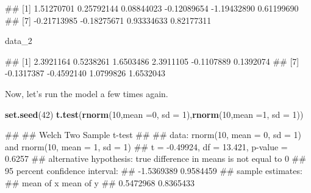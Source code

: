 \documentclass[
]{book}
\newenvironment{Shaded}{\begin{snugshade}}{\end{snugshade}}
\newcommand{\AttributeTok}[1]{\textcolor[rgb]{0.13,0.29,0.53}{#1}}
\newcommand{\DecValTok}[1]{\textcolor[rgb]{0.00,0.00,0.81}{#1}}
\newcommand{\FunctionTok}[1]{\textcolor[rgb]{0.13,0.29,0.53}{\textbf{#1}}}
\newcommand{\NormalTok}[1]{#1}
\begin{document}
\begin{Shaded}
\begin{Highlighting}[]
\NormalTok{\#\#  [1]  1.51270701  0.25792144  0.08844023 {-}0.12089654 {-}1.19432890  0.61199690}
\NormalTok{\#\#  [7] {-}0.21713985 {-}0.18275671  0.93334633  0.82177311}
\end{Highlighting}
\end{Shaded}

\begin{Shaded}
\begin{Highlighting}[]
\NormalTok{data\_2}
\end{Highlighting}
\end{Shaded}

\begin{Shaded}
\begin{Highlighting}[]
\NormalTok{\#\#  [1]  2.3921164  0.5238261  1.6503486  2.3911105 {-}0.1107889  0.1392074}
\NormalTok{\#\#  [7] {-}0.1317387 {-}0.4592140  1.0799826  1.6532043}
\end{Highlighting}
\end{Shaded}

Now, let's run the model a few times again.

\begin{Shaded}
\begin{Highlighting}[]
\FunctionTok{set.seed}\NormalTok{(}\DecValTok{42}\NormalTok{)}
\FunctionTok{t.test}\NormalTok{(}\FunctionTok{rnorm}\NormalTok{(}\DecValTok{10}\NormalTok{,}\AttributeTok{mean =}\DecValTok{0}\NormalTok{, }\AttributeTok{sd =} \DecValTok{1}\NormalTok{),}\FunctionTok{rnorm}\NormalTok{(}\DecValTok{10}\NormalTok{,}\AttributeTok{mean =}\DecValTok{1}\NormalTok{, }\AttributeTok{sd =} \DecValTok{1}\NormalTok{))}
\end{Highlighting}
\end{Shaded}

\begin{Shaded}
\begin{Highlighting}[]
\NormalTok{\#\# }
\NormalTok{\#\#  Welch Two Sample t{-}test}
\NormalTok{\#\# }
\NormalTok{\#\# data:  rnorm(10, mean = 0, sd = 1) and rnorm(10, mean = 1, sd = 1)}
\NormalTok{\#\# t = {-}0.49924, df = 13.421, p{-}value = 0.6257}
\NormalTok{\#\# alternative hypothesis: true difference in means is not equal to 0}
\NormalTok{\#\# 95 percent confidence interval:}
\NormalTok{\#\#  {-}1.5369389  0.9584459}
\NormalTok{\#\# sample estimates:}
\NormalTok{\#\# mean of x mean of y }
\NormalTok{\#\# 0.5472968 0.8365433}
\end{Highlighting}
\end{Shaded}
\end{document}
